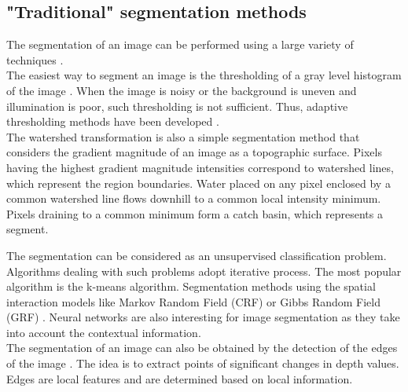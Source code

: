 \subsection{"Traditional" segmentation methods}
The segmentation of an image can be performed using a large variety of techniques \citep{wilson1988image, nitzberg1993filtering, pal1993review, zhang2006advances}. \\

The easiest way to segment an image is the thresholding of a gray level histogram of the image \citep{taxt1989segmentation}. When the image is noisy or the background is uneven and illumination is poor, such thresholding is not sufficient. Thus, adaptive thresholding methods have been developed \citep{yanowitz1989new}. \\

The watershed transformation is also a simple segmentation method that considers the gradient magnitude of an image as a topographic surface. Pixels having the highest gradient magnitude intensities correspond to watershed lines, which represent the region boundaries. Water placed on any pixel enclosed by a common watershed line flows downhill to a common local intensity minimum. Pixels draining to a common minimum form a catch basin, which represents a segment.

The segmentation can be considered as an unsupervised classification problem. Algorithms dealing with such problems adopt iterative process. The most popular algorithm is the k-means algorithm. Segmentation methods using the spatial interaction models like Markov Random Field (CRF) \citep{hansen1982image} or Gibbs Random Field (GRF) \citep{derin1987modeling}. Neural networks are also interesting for  image segmentation \citep{ghosh1991image} as they take into account the contextual information. \\

The segmentation of an image can also be obtained by the detection of the edges of the image \citep{peli1982study}. The idea is to extract points of significant changes in depth values. Edges are local features and are determined based on local information. \\

